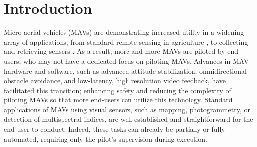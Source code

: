 \begin{abstract}
Enabling \glspl{MAV} to physically interact with their environment will usher in the next stage of \gls{MAV} utility and applications. Complex tasks, such as sensor deployment and retrieval, can be realized relatively simply, by relying on a mechanically passive system designed with the user in mind, these payloads can enable such applications to be more widely available and inclusive to end-users.
\end{abstract}



\section{Introduction}

Micro-aerial vehicles (\glspl{MAV}) are demonstrating increased utility in a widening array of applications, from standard remote sensing in agriculture \cite{Zhang2022}, to collecting and retrieving sensors \cite{Geckeler2022a, Geckeler2023a}. As a result, more and more \glspl{MAV} are piloted by end-users, who may not have a dedicated focus on piloting \glspl{MAV}. Advances in \gls{MAV} hardware and software, such as advanced attitude stabilization, omnidirectional obstacle avoidance, and low-latency, high resolution video feedback, have facilitated this transition; enhancing safety and reducing the complexity of piloting \glspl{MAV} so that more end-users can utilize this technology. Standard applications of \glspl{MAV} using visual sensors, such as mapping, photogrammetry, or detection of multispectral indices, are well established and straightforward for the end-user to conduct. Indeed, these tasks can already be partially or fully automated, requiring only the pilot's supervision during execution.

